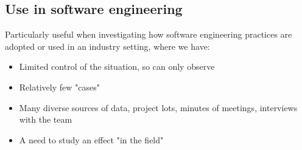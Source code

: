 \documentclass{article}[18pt]
\begin{document}
\subsection{Use in software engineering}
Particularly useful when investigating how software engineering practices are adopted or used in an industry setting, where we have:
\begin{itemize}
	\item Limited control of the situation, so can only observe
	\item Relatively few "cases"
	\item Many diverse sources of data, project lots, minutes of meetings, interviews with the team
	\item A need to study an effect "in the field"
\end{itemize}
\end{document}
